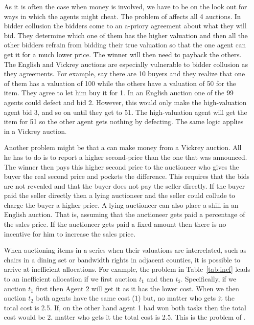 As it is often the case when money is involved, we have to be on the
look out for ways in which the agents might cheat. The problem of
 affects all 4 auctions. In bidder collusion the
bidders come to an a-priory agreement about what they will bid.  They
determine which one of them has the higher valuation and then all the
other bidders refrain from bidding their true valuation so that the
one agent can get it for a much lower price. The winner will then need
to payback the others. The English and Vickrey auctions are especially
vulnerable to bidder collusion as they 
agreements. For example, say there are 10 buyers and they realize that
one of them has a valuation of 100 while the others have a valuation
of 50 for the item. They agree to let him buy it for 1. In an English
auction one of the 99 agents could defect and bid 2. However, this
would only make the high-valuation agent bid 3, and so on until they
get to 51. The high-valuation agent will get the item for 51 so the
other agent gets nothing by defecting. The same logic applies in a
Vickrey auction.

Another problem might be that a  can make money
from a Vickrey auction. All he has to do is to report a higher
second-price than the one that was announced. The winner then pays
this higher second price to the auctioneer who gives the buyer the
real second price and pockets the difference. This requires that the
bids are not revealed and that the buyer does not pay the seller
directly. If the buyer paid the seller directly then a lying
auctioneer and the seller could collude to charge the buyer a higher
price. A lying auctioneer can also place a  shill in an English auction. That is,
assuming that the auctioneer gets paid a percentage of the sales
price. If the auctioneer gets paid a fixed amount then there is no
incentive for him to increase the sales price.
\medskip 

When auctioning items in a series when their valuations are
interrelated, such as chairs in a dining set or bandwidth rights in
adjacent counties, it is possible to arrive at inefficient
allocations. For example, the problem in Table~\ref{tab:inef} leads to
an inefficient allocation if we first auction $t_1$ and then $t_2$.
Specifically, if we auction $t_1$ first then Agent 2 will get it as it
has the lower cost. When we then auction $t_2$ both agents have the
same cost (1) but, no matter who gets it the total cost is 2.5. If, on
the other hand agent 1 had won both tasks then the total cost would be
2.  matter who gets it the total cost is 2.5. This is the problem of
.

